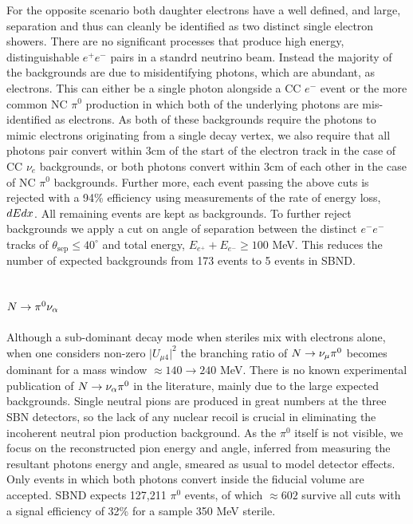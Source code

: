 \documentclass[11pt, a4paper]{article}
\def\ster{\ensuremath N}
\begin{document}
For the opposite scenario both daughter electrons have a well defined, and
large, separation and thus can cleanly be identified as two distinct single
electron showers. There are no significant processes that produce high energy,
distinguishable $e^+e^-$ pairs in a standrd neutrino beam.  Instead the
majority of the backgrounds are due to misidentifying photons, which are
abundant, as electrons. This can either be a single photon alongside a CC $e^-$
event or the more common NC $\pi^0$ production in which both of the underlying
photons are mis-identified as electrons. As both of these backgrounds require
the photons to mimic electrons originating from a single decay vertex, we also
require that all photons pair convert within 3cm of the start of the electron
track in the case of CC $\nu_e$ backgrounds, or both photons convert within 3cm
of each other in the case of NC $\pi^0$ backgrounds. Further more, each event
passing the above cuts is rejected with a 94\% efficiency using measurements of
the rate of energy loss, $dE\/dx$. All remaining events are kept as
backgrounds. To further reject backgrounds we apply a cut on angle of
separation between the distinct $e^-e^-$ tracks of $\theta_\text{sep}\leq 40
^\circ$ and total energy, $E_{e^+}+E_{e^-} \geq 100$ MeV. This reduces the
number of expected backgrounds from 173 events to 5 events in SBND. 

\subsection{$\ster\rightarrow \pi^0 \nu_\alpha$}

Although a sub-dominant decay mode when steriles mix with electrons alone, when
one considers non-zero $\vert U_{\mu4}\vert^2$ the branching ratio of $\ster
\rightarrow \nu_\mu \pi^0$ becomes dominant for a mass window $\approx 140
\rightarrow 240$ MeV. There is no known experimental publication of $\ster
\rightarrow \nu_\alpha \pi^0$ in the literature, mainly due to the large
expected backgrounds. Single neutral pions are produced in great numbers at the
three SBN detectors, so the lack of any nuclear recoil is crucial in
eliminating the incoherent neutral pion production background. As the $\pi^0$
itself is not visible, we focus on the reconstructed pion energy and angle,
inferred from measuring the resultant photons energy and angle, smeared as
usual to model detector effects. Only events in which both photons convert
inside the fiducial volume are accepted. SBND expects 127,211 $\pi^0$ events,
of which $\approx 602$ survive all cuts with a signal efficiency of 32\% for a
sample 350 MeV sterile. \\ 
\end{document}
